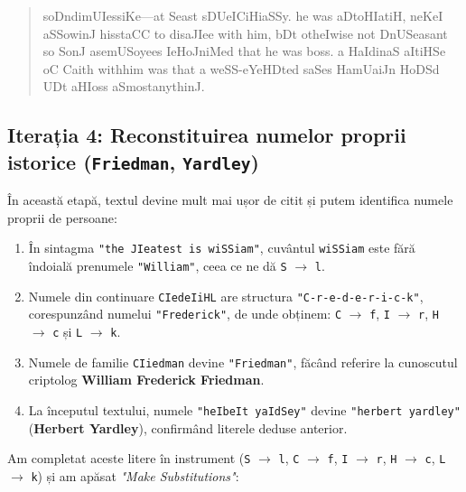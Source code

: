 \documentclass{labreport}
\begin{document}
\begin{quote}
soDndimUIessiKe---at Seast sDUeICiHiaSSy. he was aDtoHIatiH, neKeI aSSowinJ hisstaCC to disaJIee with him, bDt otheIwise not DnUSeasant so SonJ asemUSoyees IeHoJniMed that he was boss. a HaIdinaS aItiHSe oC Caith withhim was that a weSS-eYeHDted saSes HamUaiJn HoDSd UDt aHIoss aSmostanythinJ.
\end{quote}

\subsection[Iterația 4: Reconstituirea numelor proprii istorice]{Iterația 4: Reconstituirea numelor proprii istorice (\texttt{Friedman}, \texttt{Yardley})}

În această etapă, textul devine mult mai ușor de citit și putem identifica numele proprii de persoane:
\begin{enumerate}[leftmargin=*]
    \item În sintagma \texttt{"the JIeatest is wiSSiam"}, cuvântul \texttt{wiSSiam} este fără îndoială prenumele \texttt{"William"}, ceea ce ne dă \texttt{S} $\to$ \texttt{l}.
    \item Numele din continuare \texttt{CIedeIiHL} are structura \texttt{"C-r-e-d-e-r-i-c-k"}, corespunzând numelui \texttt{"Frederick"}, de unde obținem: \texttt{C} $\to$ \texttt{f}, \texttt{I} $\to$ \texttt{r}, \texttt{H} $\to$ \texttt{c} și \texttt{L} $\to$ \texttt{k}.
    \item Numele de familie \texttt{CIiedman} devine \texttt{"Friedman"}, făcând referire la cunoscutul criptolog \textbf{William Frederick Friedman}.
    \item La începutul textului, numele \texttt{"heIbeIt yaIdSey"} devine \texttt{"herbert yardley"} (\textbf{Herbert Yardley}), confirmând literele deduse anterior.
\end{enumerate}

Am completat aceste litere în instrument (\texttt{S} $\to$ \texttt{l}, \texttt{C} $\to$ \texttt{f}, \texttt{I} $\to$ \texttt{r}, \texttt{H} $\to$ \texttt{c}, \texttt{L} $\to$ \texttt{k}) și am apăsat \textit{"Make Substitutions"}:
\end{document}
